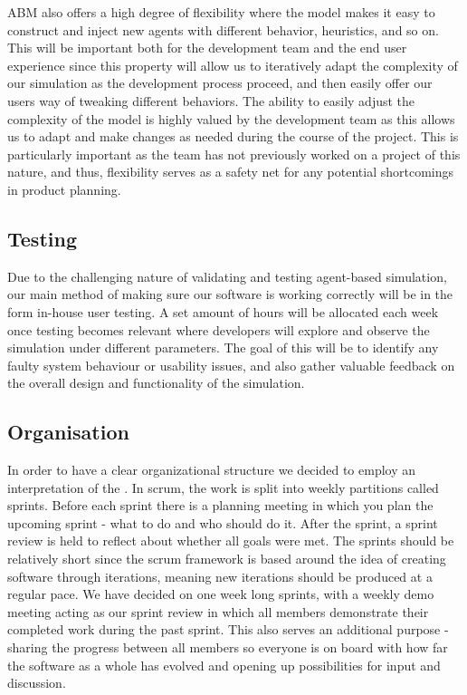     ABM also offers a high degree of flexibility where the model makes it easy to construct and inject new agents with different behavior, heuristics, and so on. This will be important both for the development team and the end user experience since this property will allow us to iteratively adapt the complexity of our simulation as the development process proceed, and then easily offer our users way of tweaking different behaviors. The ability to easily adjust the complexity of the model is highly valued by the development team as this allows us to adapt and make changes as needed during the course of the project. This is particularly important as the team has not previously worked on a project of this nature, and thus, flexibility serves as a safety net for any potential shortcomings in product planning. 

\subsection{Testing}
    Due to the challenging nature of validating and testing agent-based simulation, our main method of making sure our software is working correctly will be in the form in-house user testing. A set amount of hours will be allocated each week once testing becomes relevant where developers will explore and observe the simulation under different parameters. The goal of this will be to identify any faulty system behaviour or usability issues, and also gather valuable feedback on the overall design and functionality of the simulation.

\subsection{Organisation}
    In order to have a clear organizational structure we decided to employ an interpretation of the  \cite{scrum}. In scrum, the work is split into weekly partitions called sprints. Before each sprint there is a planning meeting in which you plan the upcoming sprint - what to do and who should do it. After the sprint, a sprint review is held to reflect about whether all goals were met. The sprints should be relatively short since the scrum framework is based around the idea of creating software through iterations, meaning new iterations should be produced at a regular pace. We have decided on one week long sprints, with a weekly demo meeting acting as our sprint review in which all members demonstrate their completed work during the past sprint. This also serves an additional purpose - sharing the progress between all members so everyone is on board with how far the software as a whole has evolved and opening up possibilities for input and discussion.


